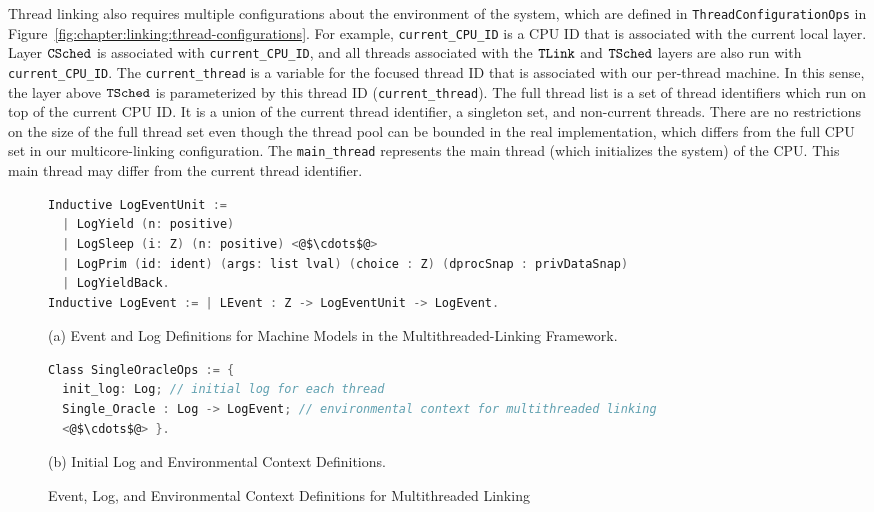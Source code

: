 Thread linking also requires multiple configurations about the environment of the system, which are defined in  
\lstinline$ThreadConfigurationOps$ in Figure~\ref{fig:chapter:linking:thread-configurations}.
For example, \lstinline$current_CPU_ID$ is a CPU ID that is 
associated with the current local layer.
Layer ${{\mathrm{\texttt{CSched}}}}$ is associated with \lstinline$current_CPU_ID$, 
and all threads associated with the ${{\mathrm{\texttt{TLink}}}}$ and ${{\mathrm{\texttt{TSched}}}}$ layers 
are also run with  \lstinline$current_CPU_ID$.
The \lstinline$current_thread$ is a variable for the focused thread ID that is associated with our per-thread machine.
In this sense, the layer above ${{\mathrm{\texttt{TSched}}}}$ is parameterized by this thread ID (\lstinline$current_thread$). 
The full thread list is a set of thread identifiers which run on top of the current CPU ID. 
It is a union of the current thread identifier, a singleton set, 
and non-current threads. 
There are no restrictions on the size of the full thread set even though 
the thread pool can be bounded in the real implementation, which differs from the full CPU set in our multicore-linking configuration.
The \lstinline$main_thread$ represents the main thread (which initializes the system) of the CPU. 
This main thread may differ from the current thread identifier.

\begin{figure}
\begin{lstlisting}[language=C]
Inductive LogEventUnit :=
  | LogYield (n: positive)
  | LogSleep (i: Z) (n: positive) <@$\cdots$@>
  | LogPrim (id: ident) (args: list lval) (choice : Z) (dprocSnap : privDataSnap) 
  | LogYieldBack.
Inductive LogEvent := | LEvent : Z -> LogEventUnit -> LogEvent.
\end{lstlisting}
\begin{center}
(a) Event and Log Definitions for Machine Models in the Multithreaded-Linking Framework.
\end{center}
\begin{lstlisting}[language=C, morekeywords={Class}]
Class SingleOracleOps := {
  init_log: Log; // initial log for each thread
  Single_Oracle : Log -> LogEvent; // environmental context for multithreaded linking
  <@$\cdots$@> }.
\end{lstlisting}
\begin{center}
(b) Initial Log and Environmental Context Definitions.
\end{center}
\caption{Event, Log, and Environmental Context Definitions for Multithreaded Linking}
\label{fig:chapter:linking:event-and-log-for-multithreaded-linking}
\end{figure}


